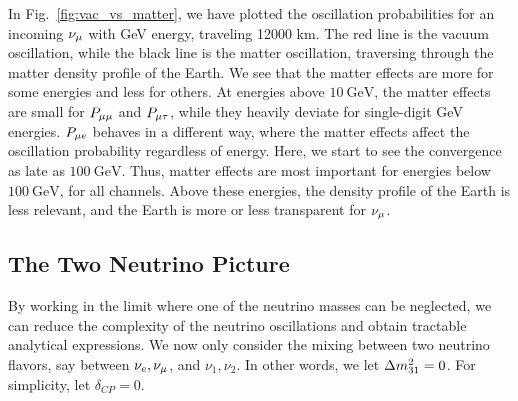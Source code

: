 In Fig.~\ref{fig:vac_vs_matter}, we have plotted the oscillation probabilities for an incoming $\nu_\mu$ with \si{\GeV} energy,
traveling 12000 km. The red line is the vacuum oscillation, while the black line is the matter oscillation, traversing through the 
matter density profile of the Earth. We see that the matter effects are more for some energies and less for others. At energies 
above $\SI{10}{\GeV}$, the matter effects are small for $P_{\mu\mu}$ and $P_{\mu \tau}$, while they heavily deviate for single-digit \si{\GeV} energies.
$P_{\mu e}$ behaves in a different way, where the matter effects affect the oscillation probability regardless of energy. Here, we start to
see the convergence as late as $\SI{100}{\GeV}$. Thus, matter effects are most important for energies below $\SI{100}{\GeV}$, for all channels.
Above these energies, the density profile of the Earth is less relevant, and the Earth is more or less transparent for $\nu_\mu$.

\subsection{The Two Neutrino Picture}
By working in the limit where one of the neutrino masses can be neglected, 
we can reduce the complexity of the neutrino oscillations and obtain tractable analytical 
expressions. 
We now only consider the mixing between two neutrino flavors, say between $\nu_e, \nu_\mu$, and $\nu_1, \nu_2$. In other words, we let $\dm[31] = 0$. For simplicity, let $\delta_{CP} = 0$.

